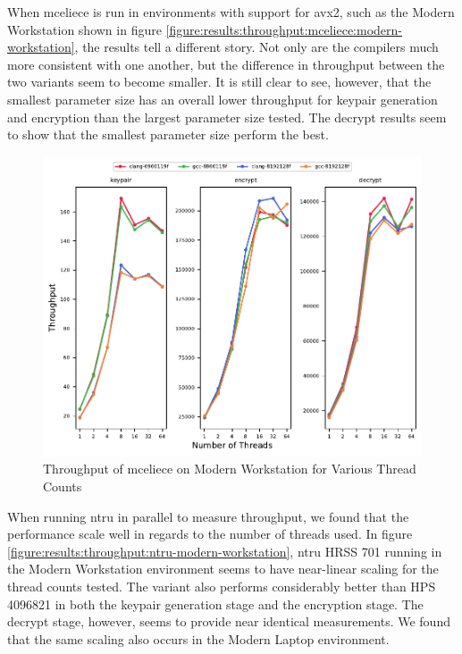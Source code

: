 When \gls{mceliece} is run in environments with support for \gls{avx2}, such as the Modern Workstation shown in figure \ref{figure:results:throughput:mceliece:modern-workstation}, the results tell a different story. Not only are the compilers much more consistent with one another, but the difference in throughput between the two variants seem to become smaller. It is still clear to see, however, that the smallest parameter size has an overall lower throughput for keypair generation and encryption than the largest parameter size tested. The decrypt results seem to show that the smallest parameter size perform the best.

\begin{figure}
    \centering
    \includegraphics[scale=0.75]{chapters/results/throughput/Modern Workstation_mceliece.pdf}
    \caption{Throughput of \gls{mceliece} on Modern Workstation for Various Thread Counts}
    \label{figure:results:throughput:mceliece-modern-workstation}
\end{figure}

When running \gls{ntru} in parallel to measure throughput, we found that the performance scale well in regards to the number of threads used. In figure \ref{figure:results:throughput:ntru-modern-workstation}, \gls{ntru} HRSS 701 running in the Modern Workstation environment seems to have near-linear scaling for the thread counts tested. The variant also performs considerably better than HPS 4096821 in both the keypair generation stage and the encryption stage. The decrypt stage, however, seems to provide near identical measurements. We found that the same scaling also occurs in the Modern Laptop environment.

